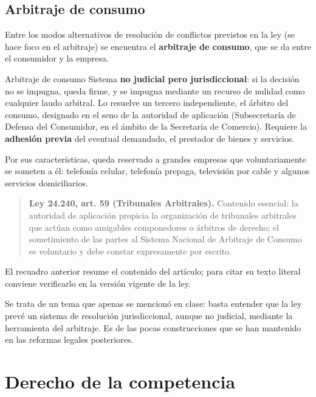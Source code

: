 \documentclass[12pt,oneside]{book}
\begin{document}
\subsection{Arbitraje de consumo}

Entre los modos alternativos de resolución de conflictos previstos en la ley (se hace foco en el arbitraje) se encuentra el \textbf{arbitraje de consumo}, que se da entre el consumidor y la empresa.

\begin{definition}{Arbitraje de consumo}
Sistema \textbf{no judicial pero jurisdiccional}: si la decisión no se impugna, queda firme, y se impugna mediante un recurso de nulidad como cualquier laudo arbitral. Lo resuelve un tercero independiente, el árbitro del consumo, designado en el seno de la autoridad de aplicación (Subsecretaría de Defensa del Consumidor, en el ámbito de la Secretaría de Comercio). Requiere la \textbf{adhesión previa} del eventual demandado, el prestador de bienes y servicios.
\end{definition}

Por sus características, queda reservado a grandes empresas que voluntariamente se someten a él: telefonía celular, telefonía prepaga, televisión por cable y algunos servicios domiciliarios.

\begin{quote}
\textbf{Ley 24.240, art. 59 (Tribunales Arbitrales).} Contenido esencial: la autoridad de aplicación propicia la organización de tribunales arbitrales que actúan como amigables componedores o árbitros de derecho; el sometimiento de las partes al Sistema Nacional de Arbitraje de Consumo es voluntario y debe constar expresamente por escrito.
\end{quote}

\begin{note}
El recuadro anterior resume el contenido del artículo; para citar su texto literal conviene verificarlo en la versión vigente de la ley.
\end{note}

Se trata de un tema que apenas se mencionó en clase: basta entender que la ley prevé un sistema de resolución jurisdiccional, aunque no judicial, mediante la herramienta del arbitraje. Es de las pocas construcciones que se han mantenido en las reformas legales posteriores.

\section{Derecho de la competencia}
\end{document}

